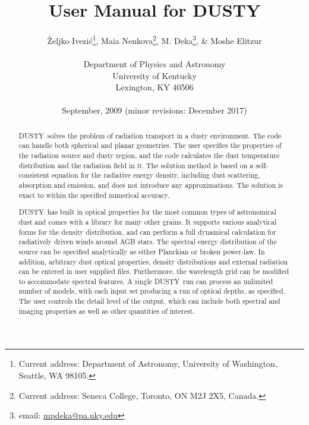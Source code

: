 \documentclass[11pt]{article}
\def\D  {{\sf DUSTY}}
\def\Ivezic {Ivezi\'c}
\begin{document}
\title{User Manual for DUSTY}

\author{\v Zeljko \Ivezic\footnote{Current address: Department of Astronomy,
  University of Washington, Seattle, WA 98105.},
  Maia Nenkova\footnote{Current address: Seneca College, Toronto, ON M2J 2X5, Canada.},
  M. Deka\footnote{email: \href{mpdeka@pa.uky.edu}{mpdeka@pa.uky.edu}},
  \& Moshe Elitzur\\
  \\Department of Physics and Astronomy\\
  University of Kentucky\\
  Lexington, KY 40506\\
  \\September, 2009 (minor revisions: December 2017) 
}
\date{}

\maketitle \thispagestyle{empty}

\vfil
\begin{abstract}

{\D\ solves the problem of radiation transport in a dusty environment. The code
can handle both spherical and planar geometries. The user specifies the
properties of the radiation source and dusty region, and the code calculates
the dust temperature distribution and the radiation field in it. The solution
method is based on a self-consistent equation for the radiative energy density,
including dust scattering, absorption and emission, and does not introduce any
approximations. The solution is exact to within the specified numerical
accuracy.

\D\ has built in optical properties for the most common types of astronomical
dust and comes with a library for many other grains. It supports various
analytical forms for the density distribution, and can perform a full dynamical
calculation for radiatively driven winds around AGB stars. The spectral energy
distribution of the source can be specified analytically as either Planckian or
broken power-law. In addition, arbitrary dust optical properties, density
distributions and external radiation can be entered in user supplied files.
Furthermore, the wavelength grid can be modified to accommodate spectral
features.  A single \D\ run can process an unlimited number of models, with
each input set producing a run of optical depths, as specified. The user
controls the detail level of the output, which can include both spectral and
imaging properties as well as other quantities of interest.}

\end{abstract}
\end{document}
